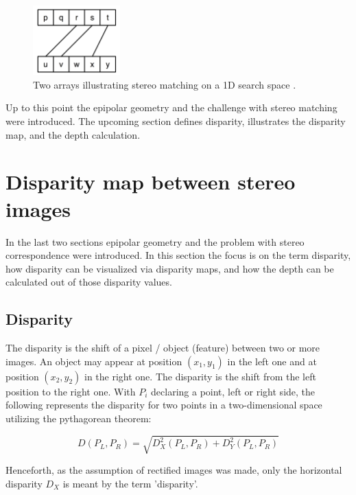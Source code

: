 \begin{figure}[h!]
  \centering
  \includegraphics[width=0.3\textwidth]{src/images/stereo-matching.png}
  \caption{Two arrays illustrating stereo matching on a 1D search space \citep{kack2004robust}.}
  \label{fig:stereo-matching}
\end{figure}

\noindent Up to this point the epipolar geometry and the challenge with stereo matching were introduced.
The upcoming section defines disparity, illustrates the disparity map, and the depth calculation.

\section{Disparity map between stereo images}

In the last two sections epipolar geometry and the problem with stereo correspondence were introduced.
In this section the focus is on the term disparity, how disparity can be visualized via disparity maps, and how the depth can be calculated out of those disparity values.

\subsection*{Disparity}

The disparity is the shift of a pixel / object (feature) between two or more images.
An object may appear at position $(x_1,y_1)$ in the left one and at position $(x_2,y_2)$ in the right one.
The disparity is the shift from the left position to the right one.
With $P_i$ declaring a point, left or right side, the following represents the disparity for two points in a two-dimensional space utilizing the pythagorean theorem:

\begin{equation}
  D(P_L,P_R) = \sqrt{D^2_X(P_L,P_R) + D^2_Y(P_L,P_R)}
\end{equation}

\noindent Henceforth, as the assumption of rectified images was made, only the horizontal disparity $D_X$ is meant by the term 'disparity'.

